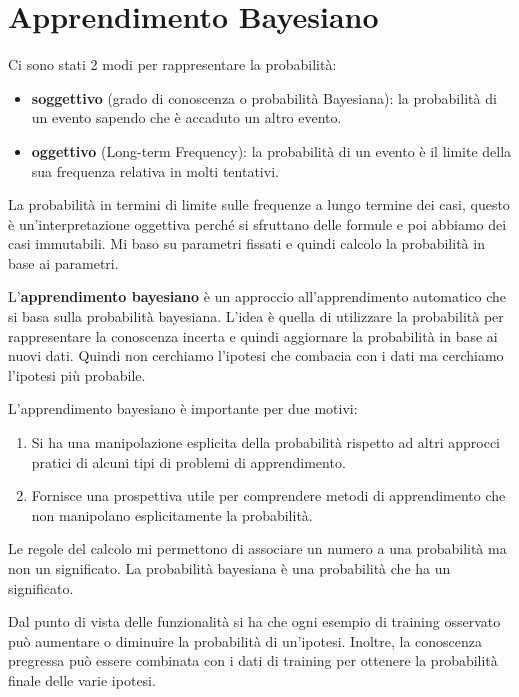 \chapter{Apprendimento Bayesiano}
Ci sono stati 2 modi per rappresentare la probabilità:
\begin{itemize}
    \item \textbf{soggettivo} (grado di conoscenza o probabilità Bayesiana): la
          probabilità di un evento sapendo che è accaduto un altro evento.
    \item \textbf{oggettivo} (Long-term Frequency): la probabilità di un evento
          è il limite della sua frequenza relativa in molti tentativi.
\end{itemize}
La probabilità in termini di limite sulle frequenze a lungo termine dei casi,
questo è un'interpretazione oggettiva perché si sfruttano delle formule e poi
abbiamo dei casi immutabili. Mi baso su parametri fissati e quindi calcolo la
probabilità in base ai parametri.

L'\textbf{apprendimento bayesiano} è un approccio all'apprendimento automatico 
che si basa sulla probabilità bayesiana. L'idea è quella di utilizzare la probabilità 
per rappresentare la conoscenza incerta e quindi aggiornare la probabilità in base
ai nuovi dati. Quindi non cerchiamo l'ipotesi che combacia con i dati ma cerchiamo
l'ipotesi più probabile.

L'apprendimento bayesiano è importante per due motivi:
\begin{enumerate}
    \item Si ha una manipolazione esplicita della probabilità rispetto ad altri
          approcci pratici di alcuni tipi di problemi di apprendimento.
    \item Fornisce una prospettiva utile per comprendere metodi di apprendimento
          che non manipolano esplicitamente la probabilità.
\end{enumerate}
Le regole del calcolo mi permettono di associare un numero a una probabilità ma
non un significato. La probabilità bayesiana è una probabilità che ha un significato.

Dal punto di vista delle funzionalità si ha che ogni esempio di training osservato
può aumentare o diminuire la probabilità di un'ipotesi. Inoltre, la conoscenza
pregressa può essere combinata con i dati di training per ottenere la probabilità
finale delle varie ipotesi.

